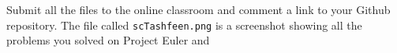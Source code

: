 \documentclass{homework}
\begin{document}
Submit all the files to the online classroom and comment a link to
your Github repository. The file called \texttt{scTashfeen.png} is a
screenshot showing all the problems you solved on Project Euler and

\end{document}
